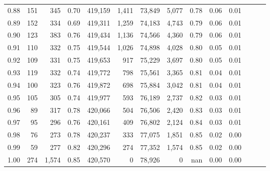 \begin{tabular}{rrrrrrrrrrrrrr}
0.88 &     151 &    345 &  0.70 &  419,159 &    1,411 &  73,849 &   5,077 &  0.78 &  0.06 &      0.01 \\
0.89 &     152 &    334 &  0.69 &  419,311 &    1,259 &  74,183 &   4,743 &  0.79 &  0.06 &      0.01 \\
0.90 &     123 &    383 &  0.76 &  419,434 &    1,136 &  74,566 &   4,360 &  0.79 &  0.06 &      0.01 \\
0.91 &     110 &    332 &  0.75 &  419,544 &    1,026 &  74,898 &   4,028 &  0.80 &  0.05 &      0.01 \\
0.92 &     109 &    331 &  0.75 &  419,653 &      917 &  75,229 &   3,697 &  0.80 &  0.05 &      0.01 \\
0.93 &     119 &    332 &  0.74 &  419,772 &      798 &  75,561 &   3,365 &  0.81 &  0.04 &      0.01 \\
0.94 &     100 &    323 &  0.76 &  419,872 &      698 &  75,884 &   3,042 &  0.81 &  0.04 &      0.01 \\
0.95 &     105 &    305 &  0.74 &  419,977 &      593 &  76,189 &   2,737 &  0.82 &  0.03 &      0.01 \\
0.96 &      89 &    317 &  0.78 &  420,066 &      504 &  76,506 &   2,420 &  0.83 &  0.03 &      0.01 \\
0.97 &      95 &    296 &  0.76 &  420,161 &      409 &  76,802 &   2,124 &  0.84 &  0.03 &      0.01 \\
0.98 &      76 &    273 &  0.78 &  420,237 &      333 &  77,075 &   1,851 &  0.85 &  0.02 &      0.00 \\
0.99 &      59 &    277 &  0.82 &  420,296 &      274 &  77,352 &   1,574 &  0.85 &  0.02 &      0.00 \\
1.00 &     274 &  1,574 &  0.85 &  420,570 &        0 &  78,926 &       0 &   nan &  0.00 &      0.00 \\
\bottomrule
\end{tabular}
